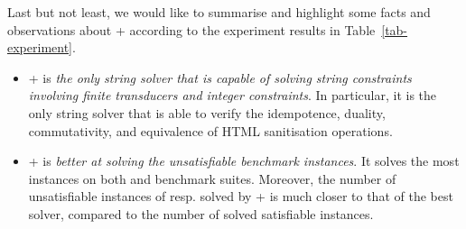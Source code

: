 Last but not least, we would like to summarise and highlight some facts and observations about {\ostrich}+  according to the experiment results in Table~\ref{tab-experiment}.
\begin{itemize}
\item {\ostrich}+ is \emph{the only string solver that is capable of solving string constraints involving finite transducers and integer constraints}. In particular, it is the only string solver that is able to verify the idempotence, duality, commutativity, and equivalence of HTML sanitisation operations.
%
\item {\ostrich}+ is \emph{better at solving the unsatisfiable benchmark instances}. It solves the most instances on both {\slogbenchra} and {\slogbenchr} benchmark suites. Moreover, the number of unsatisfiable instances of {\pyexbench} resp. {\kaluzabench} solved by {\ostrich}+ is much closer to that of the best solver, compared to the number of solved satisfiable instances.   
\end{itemize}





